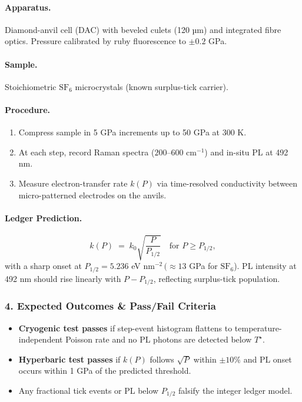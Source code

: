 \documentclass[11pt,oneside]{book}
\begin{document}
{\paragraph{Apparatus.}  
Diamond-anvil cell (DAC) with beveled culets (120 µm) and integrated fibre optics.  Pressure calibrated by ruby fluorescence to $\pm0.2$ GPa.

\paragraph{Sample.}  
Stoichiometric \(\mathrm{SF_6}\) microcrystals (known surplus-tick carrier).

\paragraph{Procedure.}
\begin{enumerate}[label=\alph*)]
\item Compress sample in 5 GPa increments up to 50 GPa at 300 K.  
\item At each step, record Raman spectra ($200$–$600$ cm$^{-1}$) and in-situ PL at 492 nm.  
\item Measure electron-transfer rate $k(P)$ via time-resolved conductivity between micro-patterned electrodes on the anvils.
\end{enumerate}

\paragraph{Ledger Prediction.}
\[
   k(P) \;=\; k_0 \sqrt{\frac{P}{P_{1/2}}}
   \quad\text{for } P \ge P_{1/2},
\]
with a sharp onset at $P_{1/2}=5.236$ eV nm$^{-2}\,(\approx 13$ GPa for \(\mathrm{SF_6}\)).  
PL intensity at 492 nm should rise linearly with $P-P_{1/2}$, reflecting surplus-tick population.

\subsubsection*{4. Expected Outcomes \& Pass/Fail Criteria}

\begin{itemize}
\item \textbf{Cryogenic test passes} if step-event histogram flattens to temperature-independent Poisson rate and no PL photons are detected below $T^\star$.  
\item \textbf{Hyperbaric test passes} if $k(P)$ follows $\sqrt{P}$ within $\pm10\%$ and PL onset occurs within 1 GPa of the predicted threshold.  
\item Any fractional tick events or PL below $P_{1/2}$ falsify the integer ledger model.
\end{itemize}

}
\end{document}
